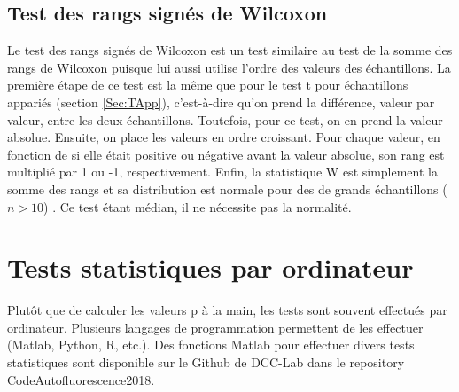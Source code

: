 \documentclass{article}       %
\begin{document}
\subsection{Test des rangs signés de Wilcoxon}

Le test des rangs signés de Wilcoxon est un test similaire au test de la somme des rangs de Wilcoxon puisque lui aussi utilise l'ordre des valeurs des échantillons. La première étape de ce test est la même que pour le test t pour échantillons appariés (section \ref{Sec:TApp}), c'est-à-dire qu'on prend la différence, valeur par valeur, entre les deux échantillons. Toutefois, pour ce test, on en prend la valeur absolue. Ensuite, on place les valeurs en ordre croissant. Pour chaque valeur, en fonction de si elle était positive ou négative avant la valeur absolue, son rang est multiplié par 1 ou -1, respectivement. Enfin, la statistique W est simplement la somme des rangs et sa distribution est normale pour des de grands échantillons ($n>10$) \cite{WSR}. Ce test étant médian, il ne nécessite pas la normalité.


\section{Tests statistiques par ordinateur}

Plutôt que de calculer les valeurs p à la main, les tests sont souvent effectués par ordinateur. Plusieurs langages de programmation permettent de les effectuer (Matlab, Python, R, etc.). Des fonctions Matlab pour effectuer divers tests statistiques sont disponible sur le Github de DCC-Lab dans le repository CodeAutofluorescence2018.







\newpage
\end{document}
